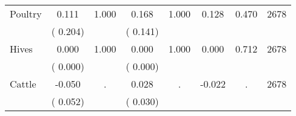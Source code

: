 \begin{tabular}{l*{7}{c}}
 Poultry       &              0.111       &        1.000  &              0.168       &        1.000  &              0.128       &              0.470 &  2678 \\ 
                       &       (       0.204)             &                               &       (       0.141)                     &                               &                                               &                                &                      \\ 

 Hives       &              0.000       &        1.000  &              0.000       &        1.000  &              0.000       &              0.712 &  2678 \\ 
                       &       (       0.000)             &                               &       (       0.000)                     &                               &                                               &                                &                      \\ 

 Cattle       &             -0.050       &            .  &              0.028       &            .  &             -0.022       &                  . &  2678 \\ 
                       &       (       0.052)             &                               &       (       0.030)                     &                               &                                               &                                &                      \\ 

\hline \end{tabular}